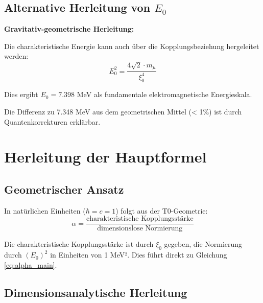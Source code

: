\documentclass[12pt,a4paper]{article}
\newcommand{\xipar}{\xi_0}
\newcommand{\Ezero}{E_0}
\begin{document}
	\subsection{Alternative Herleitung von $\Ezero$}
	
	\begin{alternative}
		\textbf{Gravitativ-geometrische Herleitung:}
		
		Die charakteristische Energie kann auch über die Kopplungsbeziehung hergeleitet werden:
		\begin{equation}
			\Ezero^2 = \frac{4\sqrt{2} \cdot m_\mu}{\xipar^4}
		\end{equation}
		
		Dies ergibt $\Ezero = 7.398$ MeV als fundamentale elektromagnetische Energieskala.
		
		Die Differenz zu 7.348 MeV aus dem geometrischen Mittel (< 1\%) ist durch Quantenkorrekturen erklärbar.
	\end{alternative}
	
	\section{Herleitung der Hauptformel}
	
	\subsection{Geometrischer Ansatz}
	
	In natürlichen Einheiten ($\hbar = c = 1$) folgt aus der T0-Geometrie:
	\begin{equation}
		\alpha = \frac{\text{charakteristische Kopplungsstärke}}{\text{dimensionslose Normierung}}
		\label{eq:alpha_geometric}
	\end{equation}
	
	Die charakteristische Kopplungsstärke ist durch $\xipar$ gegeben, die Normierung durch $(\Ezero)^2$ in Einheiten von 1 MeV². Dies führt direkt zu Gleichung \eqref{eq:alpha_main}.
	
	\subsection{Dimensionsanalytische Herleitung}
	
\end{document}
